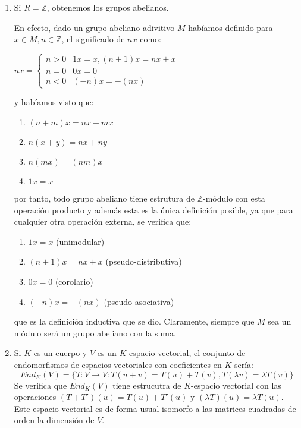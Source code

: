 \begin{example}
\begin{enumerate}
\item Si $R = \mathbb{Z}$, obtenemos los grupos abelianos.

En efecto, dado un grupo abeliano adivitivo $M$ habíamos definido para $x \in M,n \in \mathbb{Z}$, el significado de $nx$ como:

$
nx =
\begin{cases}
 n > 0 & 1x = x, (n+1)x = nx+x \\
 n = 0 & 0x = 0 \\
 n < 0 & (-n)x = -(nx)
\end{cases}
$ 

y habíamos visto que:

\begin{enumerate}
\item $(n+m)x = nx + mx$
\item $n(x+y) = nx+ny$
\item $n(mx) = (nm)x$
\item $1x = x$
\end{enumerate}

por tanto, todo grupo abeliano tiene estrutura de $\mathbb{Z}$-módulo con esta operación producto y además esta es la única definición posible, ya que para cualquier otra operación externa, se verifica que:

\begin{enumerate}
\item $1x = x$ (unimodular)
\item $(n+1)x = nx + x$ (pseudo-distributiva)
\item $0x = 0$ (corolario)
\item $(-n)x = -(nx)$ (pseudo-asociativa)
\end{enumerate} 

que es la definición inductiva que se dio. Claramente, siempre que $M$ sea un módulo será un grupo abeliano con la suma. 

\item Si $K$ es un cuerpo y $V$ es un $K$-espacio vectorial, el conjunto de endomorfismos de espacios vectoriales con coeficientes en $K$ sería: $$End_K(V) = \{T:V \to V:T(u+v) = T(u) + T(v),T(\lambda v) = \lambda T(v) \}$$ Se verifica que $End_K(V)$ tiene estrucutra de $K$-espacio vectorial con las operaciones $(T+T')(u) = T(u)+T'(u)$ y $(\lambda T)(u) = \lambda T(u)$. Este espacio vectorial es de forma usual isomorfo a las matrices cuadradas de orden la dimensión de $V$. 


\end{enumerate}
\end{example}
